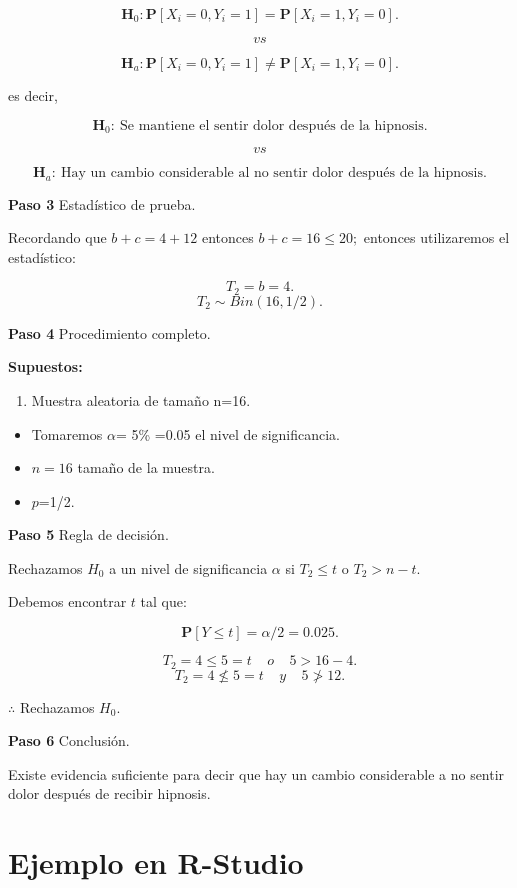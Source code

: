 \documentclass[
  a4paper,
  oneside,
  openany]{book}
\providecommand{\tightlist}{%
  \setlength{\itemsep}{0pt}\setlength{\parskip}{0pt}}
\begin{document}
\[\textbf{H}_0: \mathbf{P}[X_{i}=0,Y_{i}=1]= \mathbf{P}[X_{i}=1,Y_{i}=0].\]

\[vs\]

\[\textbf{H}_a: \mathbf{P}[X_{i}=0,Y_{i}=1]\neq \mathbf{P}[X_{i}=1,Y_{i}=0].\]

es decir,

\[\textbf{H}_0: \ \mbox{Se mantiene el sentir dolor después de la hipnosis.}\]

\[vs\]

\[\textbf{H}_a:\ \mbox{Hay un cambio considerable al no sentir dolor después de la hipnosis.}\]

\textbf{Paso 3} Estadístico de prueba.

Recordando que \(b+c=4+12\) entonces \(b+c=16\leq20;\) entonces utilizaremos el estadístico:

\[T_{2}=b=4.\]
\[T_{2}\sim Bin(16,1/2).\]

\textbf{Paso 4} Procedimiento completo.

\textbf{Supuestos:}

\begin{enumerate}
\def\labelenumi{\arabic{enumi}.}
\tightlist
\item
  Muestra aleatoria de tamaño n=16.
\end{enumerate}

\begin{itemize}
\item
  Tomaremos \(\alpha\)= 5\% =0.05 el nivel de significancia.
\item
  \(n=16\) tamaño de la muestra.
\item
  \(p\)=1/2.
\end{itemize}

\textbf{Paso 5} Regla de decisión.

Rechazamos \(H_0\) a un nivel de significancia \(\alpha\) si \(T_{2} \leq t\) o \(T_{2}>n-t.\)

Debemos encontrar \(t\) tal que:

\[\mathbf{P}[Y \leq t]=\alpha/2=0.025.\]

\[T_{2}=4 \leq 5=t  \ \ \ \ \   o  \ \ \ \ \      5>16-4.  \]
\[T_{2}=4 \nleq 5=t   \ \ \ \ \   y   \ \ \ \ \      5\ngtr12.\]

\(\therefore\) Rechazamos \(H_0.\)

\textbf{Paso 6} Conclusión.

Existe evidencia suficiente para decir que hay un cambio considerable a no sentir dolor después de recibir hipnosis.

\hypertarget{ejemplo-en-r-studio-3}{%
\section{Ejemplo en R-Studio}\label{ejemplo-en-r-studio-3}}
\end{document}
